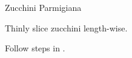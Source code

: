 \begin{recipe}{Zucchini Parmigiana}{}{}

\begin{ingredients}
\item {}
\end{ingredients}

\begin{directions}
\item Thinly slice zucchini length-wise.
\item Follow steps in .
\end{directions}
\end{recipe}

